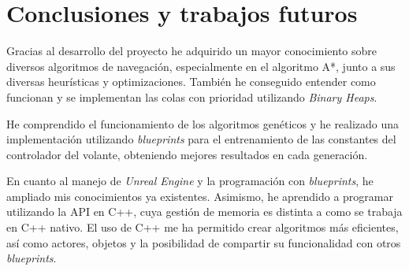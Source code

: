 

\chapter{Conclusiones y trabajos futuros}


Gracias al desarrollo del proyecto he adquirido un mayor conocimiento sobre diversos algoritmos de navegación, especialmente en el algoritmo A*, junto a sus diversas heurísticas y optimizaciones. También he conseguido entender como funcionan y se implementan las colas con prioridad utilizando \textit{Binary Heaps}.

\bigskip
 
He comprendido el funcionamiento de los algoritmos genéticos y he realizado una implementación utilizando \textit{blueprints} para el entrenamiento de las constantes del controlador del volante, obteniendo mejores resultados en cada generación.

\bigskip


En cuanto al manejo de \textit{Unreal Engine} y la programación con \textit{blueprints}, he ampliado mis conocimientos ya existentes.
Asimismo, he aprendido a programar utilizando la API en C++, cuya gestión de memoria es distinta a como se trabaja en C++ nativo. El uso de C++ me ha permitido crear algoritmos más eficientes, así como actores, objetos y la posibilidad de compartir su funcionalidad con otros \textit{blueprints}.

\bigskip

